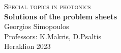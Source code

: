 \begin{titlepage}
%
%

\vspace{10mm}


\begin{center}
{\large \textsc{Special topics in photonics}}\\[3\baselineskip]


{\noindent\Huge\bfseries
Solutions of the problem sheets
}\\[\baselineskip] %



{\Large Georgios Simopoulos}\\[\baselineskip] %
{\small Professors: K.Makris, D.Psaltis }\\[3\baselineskip] %


{\noindent Heraklion 2023}\\[\baselineskip]
\end{center} %

%
%
\end{titlepage}